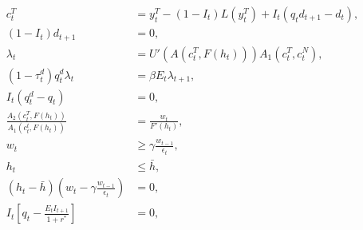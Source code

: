 \begin{align}
    c^T_t &= y^T_t - (1 - I_t)L(y^T_t) + I_t(q_t d_{t+1} - d_t), \\
    (1 - I_t)d_{t+1} &= 0, \\
    \lambda_t &= U'(A(c^T_t, F(h_t)))A_1(c_t^T, c_t^N),\\
    (1-\tau_t^d)q_t^d \lambda_t &= \beta E_t \lambda_{t+1}, \\
    I_t(q^d_t - q_t) &= 0, \\
    \frac{A_2(c_t^T, F(h_t))}{A_1(c_t^t, F(h_t))} &= \frac{w_t}{F'(h_t)} , \\
   w_t &\ge \gamma\frac{w_{t-1}}{\epsilon_t},\\
   h_t &\le \bar{h},\\
   \left( h_t - \bar{h} \right) \left( w_t - \gamma\frac{w_{t-1}}{\epsilon_t}\right) &= 0, \\
    I_t \left[ q_t - \frac{E_t I_{t+1}}{1+r^*} \right] &= 0,
\end{align}